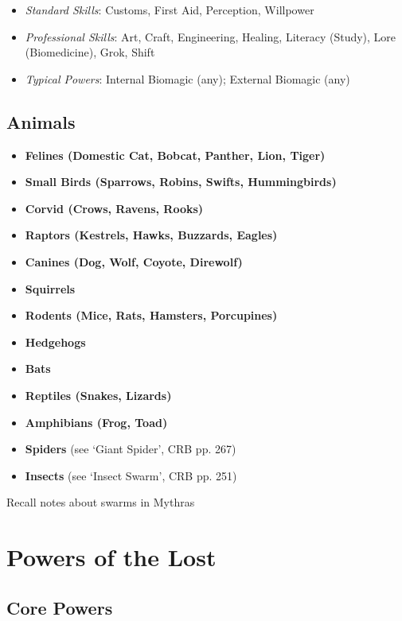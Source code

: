 \documentclass[letterpaper,serif]{rpg-module}
\begin{document}
\begin{itemize}
    \begin{itemize}
        \item \emph{Standard Skills}: Customs, First Aid, Perception, Willpower
        \item \emph{Professional Skills}: Art, Craft, Engineering, Healing, Literacy (Study), Lore (Biomedicine), Grok, Shift
        \item \emph{Typical Powers}: Internal Biomagic (any); External Biomagic (any) 
    \end{itemize}
    
\end{itemize}

\subsection{Animals}

\begin{itemize}
    \item \textbf{Felines (Domestic Cat, Bobcat, Panther, Lion, Tiger)}
    \item \textbf{Small Birds (Sparrows, Robins, Swifts, Hummingbirds)}
    \item \textbf{Corvid (Crows, Ravens, Rooks)}
    \item \textbf{Raptors (Kestrels, Hawks, Buzzards, Eagles)}
    \item \textbf{Canines (Dog, Wolf, Coyote, Direwolf)}
    \item \textbf{Squirrels}
    \item \textbf{Rodents (Mice, Rats, Hamsters, Porcupines)}
    \item \textbf{Hedgehogs}
    \item \textbf{Bats}
    \item \textbf{Reptiles (Snakes, Lizards)}
    \item \textbf{Amphibians (Frog, Toad)}
    \item \textbf{Spiders} (see `Giant Spider', CRB pp. 267)
    \item \textbf{Insects} (see `Insect Swarm', CRB pp. 251)
\end{itemize}

Recall notes about swarms in Mythras

\section{Powers of the Lost}

\subsection{Core Powers}
\end{document}
